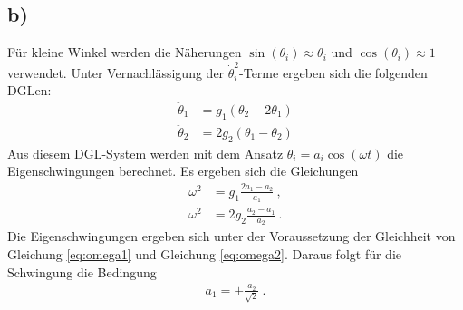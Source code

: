 \subsection*{b)}
Für kleine Winkel werden die Näherungen $\sin(\theta_i)\approx\theta_i$ und $\cos(\theta_i)\approx 1$ verwendet.
Unter Vernachlässigung der $\dot\theta_i^2$-Terme ergeben sich die folgenden DGLen:
\begin{align}
\ddot\theta_1&=g_1(\theta_2-2\theta_1)\\
\ddot\theta_2&=2g_2(\theta_1-\theta_2)
\end{align}
Aus diesem DGL-System werden mit dem Ansatz $\theta_i=a_i\cos(\omega t)$ die Eigenschwingungen berechnet.
Es ergeben sich die Gleichungen
\begin{align}
\omega^2&=g_1\frac{2a_1-a_2}{a_1}\label{eq:omega1}~,\\
\omega^2&=2g_2\frac{a_2-a_1}{a_2}\label{eq:omega2}~.
\end{align}
Die Eigenschwingungen ergeben sich unter der Voraussetzung der Gleichheit von Gleichung \eqref{eq:omega1} und Gleichung \eqref{eq:omega2}.
Daraus folgt für die Schwingung die Bedingung
\begin{align}
a_1=\pm\frac{a_2}{\sqrt{2}}~.
\end{align}

